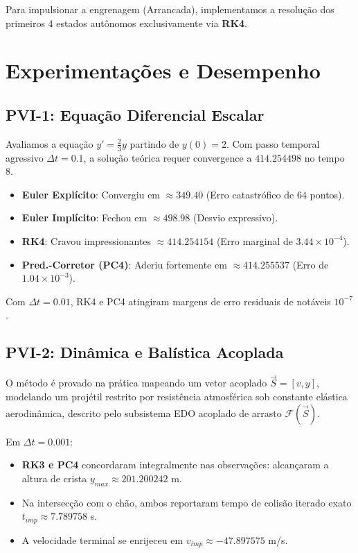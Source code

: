 \documentclass[12pt,a4paper]{article}
\begin{document}
Para impulsionar a engrenagem (Arrancada), implementamos a resolução dos primeiros 4 estados autônomos exclusivamente via \textbf{RK4}.

\section{Experimentações e Desempenho}

\subsection{PVI-1: Equação Diferencial Escalar}
Avaliamos a equação $y' = \frac{2}{3}y$ partindo de $y(0) = 2$.
Com passo temporal agressivo $\Delta t = 0.1$, a solução teórica requer convergence a $414.254498$ no tempo 8.

\begin{itemize}
    \item \textbf{Euler Explícito}: Convergiu em $\approx 349.40$ (Erro catastrófico de 64 pontos).
    \item \textbf{Euler Implícito}: Fechou em $\approx 498.98$ (Desvio expressivo).
    \item \textbf{RK4}: Cravou impressionantes $\approx 414.254154$ (Erro marginal de $3.44 \times 10^{-4}$).
    \item \textbf{Pred.-Corretor (PC4)}: Aderiu fortemente em $\approx 414.255537$ (Erro de $1.04 \times 10^{-3}$).
\end{itemize}
Com $\Delta t = 0.01$, RK4 e PC4 atingiram margens de erro residuais de notáveis $10^{-7}$.

\subsection{PVI-2: Dinâmica e Balística Acoplada}
O método é provado na prática mapeando um vetor acoplado $\vec{S} = [v, y]$, modelando um projétil restrito por resistência atmosférica sob constante elástica aerodinâmica, descrito pelo subsistema EDO acoplado de arrasto $\mathcal{F}(\vec{S})$.

Em $\Delta t = 0.001$:
\begin{itemize}
    \item \textbf{RK3 e PC4} concordaram integralmente nas observações: alcançaram a altura de crista $y_{max} \approx 201.200242$ m.
    \item Na intersecção com o chão, ambos reportaram tempo de colisão iterado exato $t_{imp} \approx 7.789758$ s.
    \item A velocidade terminal se enrijeceu em $v_{imp} \approx -47.897575$ m/s.
\end{itemize}
\end{document}

